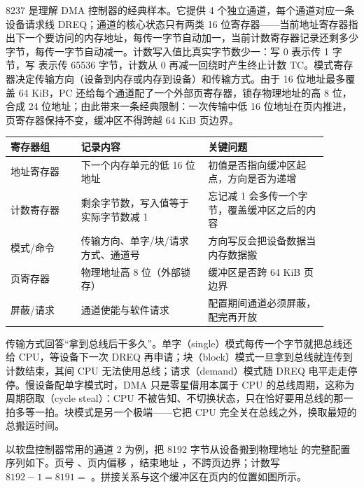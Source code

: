8237 是理解 DMA 控制器的经典样本。它提供 4 个独立通道，每个通道对应一条设备请求线 DREQ；通道的核心状态只有两类 16 位寄存器——当前地址寄存器指出下一个要访问的内存地址，每传一字节自动加一，当前计数寄存器记录还剩多少字节，每传一字节自动减一。计数写入值比真实字节数少一：写 0 表示传 1 字节，写  表示传 65536 字节，计数从 0 再减一回绕时产生终止计数 TC。模式寄存器决定传输方向（设备到内存或内存到设备）和传输方式。由于 16 位地址最多覆盖 64 KiB，PC 还给每个通道配了一个外部页寄存器，锁存物理地址的高 8 位，合成 24 位地址；由此带来一条经典限制：一次传输中低 16 位地址在页内推进，页寄存器保持不变，缓冲区不得跨越 64 KiB 页边界。

\begin{longtable}{L{0.20\linewidth}L{0.36\linewidth}L{0.34\linewidth}}
\toprule
寄存器组 & 记录内容 & 关键问题 \\
\midrule
地址寄存器 & 下一个内存单元的低 16 位地址 & 初值是否指向缓冲区起点，方向是否为递增 \\\tablerowrule
计数寄存器 & 剩余字节数，写入值等于实际字节数减 1 & 忘记减 1 会多传一个字节，覆盖缓冲区之后的内容 \\\tablerowrule
模式/命令 & 传输方向、单字/块/请求方式、通道号 & 方向写反会把设备数据当内存数据搬 \\\tablerowrule
页寄存器 & 物理地址高 8 位（外部锁存） & 缓冲区是否跨 64 KiB 页边界 \\\tablerowrule
屏蔽/请求 & 通道使能与软件请求 & 配置期间通道必须屏蔽，配完再开放 \\
\bottomrule
\end{longtable}

传输方式回答“拿到总线后干多久”。单字（single）模式每传一个字节就把总线还给 CPU，等设备下一次 DREQ 再申请；块（block）模式一旦拿到总线就连传到计数结束，其间 CPU 无法使用总线；请求（demand）模式随 DREQ 电平走走停停。慢设备配单字模式时，DMA 只是零星借用本属于 CPU 的总线周期，这称为周期窃取（cycle steal）：CPU 不被告知、不切换状态，只在恰好要用总线的那一拍多等一拍。块模式是另一个极端——它把 CPU 完全关在总线之外，换取最短的总搬运时间。

以软盘控制器常用的通道 2 为例，把 8192 字节从设备搬到物理地址  的完整配置序列如下。页号 、页内偏移 ，结束地址 ，不跨页边界；计数写 $8192-1=8191=$ 。拼接关系与这个缓冲区在页内的位置如图所示。

